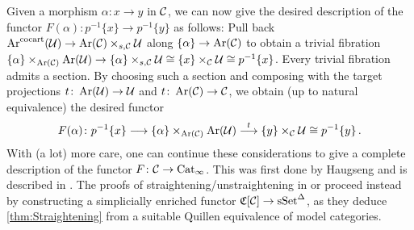 \begin{numpar}
	Given a morphism $\alpha\colon x\rightarrow y$ in $\mathcal{C}$, we can now give the desired description of the functor $F(\alpha)\colon p^{-1}\{x\}\rightarrow p^{-1}\{y\}$ as follows: Pull back $\operatorname{Ar}^{\mathrm{cocart}}(\mathcal{U})\rightarrow \operatorname{Ar}(\mathcal{C})\times_{s,\mathcal{C}}\mathcal{U}$ along $\{\alpha\}\rightarrow \operatorname{Ar}(\mathcal{C})$ to obtain a trivial fibration $\{\alpha\}\times_{\operatorname{Ar}(\mathcal{C})}\operatorname{Ar}(\mathcal{U})\rightarrow \{\alpha\}\times_{s,\mathcal{C}}\mathcal{U}\cong \{x\}\times_{\mathcal{C}}\mathcal{U}\cong p^{-1}\{x\}$. Every trivial fibration admits a section. By choosing such a section and composing with the target projections $t\colon \operatorname{Ar}(\mathcal{U})\rightarrow \mathcal{U}$ and $t\colon \operatorname{Ar}(\mathcal{C})\rightarrow \mathcal{C}$, we obtain (up to natural equivalence) the desired functor
	\begin{equation*}
		F(\alpha)\colon p^{-1}\{x\}\longrightarrow \{\alpha\}\times_{\operatorname{Ar}(\mathcal{C})}\operatorname{Ar}(\mathcal{U})\overset{t}{\longrightarrow} \{y\}\times_{\mathcal{C}}\mathcal{U}\cong p^{-1}\{y\}\,.
	\end{equation*}	
	With (a lot) more care, one can continue these considerations to give a complete description of the functor $F\colon \mathcal{C}\rightarrow \mathrm{Cat}_\infty$. This was first done by Haugseng and is described in \cite[\S3.3]{Land}. The proofs of straightening/unstraightening in \cite{HeutsStraightening} or \cite[\S\href{https://people.math.harvard.edu/~lurie/papers/HTT.pdf\#section.3.2}{3.2}]{HTT} proceed instead by constructing a simplicially enriched functor $\mathfrak{C}[\mathcal{C}]\rightarrow \mathrm{sSet}^\Delta$, as they deduce \cref{thm:Straightening} from a suitable Quillen equivalence of model categories.
\end{numpar}
